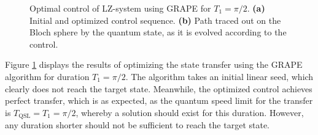 \begin{figure}[h!]
\caption{Optimal control of LZ-system using GRAPE for $T_1 = \pi / 2$. \textbf{(a)} Initial and optimized control sequence. \textbf{(b)} Path traced out on the Bloch sphere by the quantum state, as it is evolved according to the control.}
\label{fig:LZopt1}
\end{figure}

Figure \ref{fig:LZopt1} displays the results of optimizing the state transfer using the GRAPE algorithm for duration $T_1 = \pi / 2$. The algorithm takes an initial linear seed, which clearly does not reach the target state. Meanwhile, the optimized control achieves perfect transfer, which is as expected, as the quantum speed limit for the transfer is $T_{\mathrm{QSL}} = T_1 = \pi / 2$, whereby a solution should exist for this duration. However, any duration shorter should not be sufficient to reach the target state.\\ 
